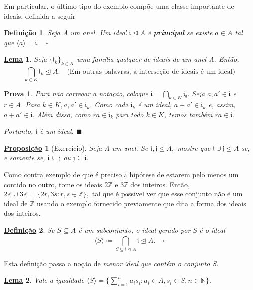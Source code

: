 \documentclass{article}
\newtheorem*{def*}{\underline{Defini\c c\~ao}}
\newtheorem*{lemma*}{\underline{Lema}}
\newtheorem*{prop*}{\underline{Proposi\c c\~ao}}
\newtheorem*{proof*}{\underline{Prova}}
\renewcommand\qedsymbol{$\blacksquare$}
\begin{document}
Em particular, o último tipo do exemplo compõe uma classe importante de ideais, definida a seguir
\begin{def*}
  Seja A um anel. Um ideal \(\mathfrak{i}\trianglelefteq{A}\) é \textbf{principal} se existe \(a\in A\) tal que \(\langle a \rangle = \mathfrak{i}.\quad\square\)
\end{def*}
\begin{lemma*}
  Seja \(\{\mathfrak{i}_{k}\}_{k\in K}\) uma família qualquer de ideais de um anel A. Então, 
  \[
    \bigcap_{k\in K}^{}{\mathfrak{i}_{k}}\trianglelefteq{A}.\quad \text{(Em outras palavras, a interseção de ideais é um ideal)}
  \]
\end{lemma*}
\begin{proof*}
  Para não carregar a notação, coloque \(\mathfrak{i} = \bigcap_{k\in K}^{}{\mathfrak{i_{k}}}.\) Seja \(a, a'\in \mathfrak{i}\) e \(r\in A\).
  Para \(k\in K, a, a'\in \mathfrak{i}_{k}\). Como cada \(\mathfrak{i}_{k}\) é um ideal, \(a + a'\in \mathfrak{i}_{k}\) e, assim,
  \(a + a'\in \mathfrak{i}.\) Além disso, como \(ra\in \mathfrak{i}_{k}\) para todo \(k\in K\), temos também \(ra \in \mathfrak{i}.\)

  Portanto, \(\mathfrak{i}\) é um ideal. \qedsymbol
\end{proof*}
\begin{prop*}[Exercício]
  Seja A um anel. Se \(\mathfrak{i}, \mathfrak{j}\trianglelefteq{A},\) mostre que \(\mathfrak{i}\cup \mathfrak{j}\trianglelefteq{A}\) se, e somente se,
  \(\mathfrak{i}\subseteq{\mathfrak{j}}\) ou \(\mathfrak{j}\subseteq{\mathfrak{i}}.\)
\end{prop*}
  Como contra exemplo de que é preciso a hipótese de estarem pelo menos um contido no outro, tome os ideais \(2 \mathbb{Z}\) e \(3 \mathbb{Z}\) dos inteiros.
Então, \(2\mathbb{Z}\cup 3 \mathbb{Z} = \{2r, 3s: r, s \in \mathbb{Z}\},\) tal que é possível ver que esse conjunto não é um ideal de \(\mathbb{Z}\) usando o exemplo
fornecido previamente que dita a forma dos ideais dos inteiros.
\begin{def*}
  Se \(S\subseteq{A}\) é um subconjunto, o ideal gerado por S é o ideal 
  \[
    \langle S \rangle\coloneqq \bigcap_{S\subseteq{\mathfrak{i}}\trianglelefteq{A}}^{}{\mathfrak{i}} \trianglelefteq{A}.\quad\square
  \]
\end{def*}
Esta definição passa a noção de \textit{menor ideal que contém o conjunto S.}
\begin{lemma*}
  Vale a igualdade \(\langle S \rangle = \{\sum\limits_{i=1}^{n}a_{i}s_{i}: a_{i}\in A, s_{i}\in S, n\in \mathbb{N}\}.\)
\end{lemma*}
\end{document}
